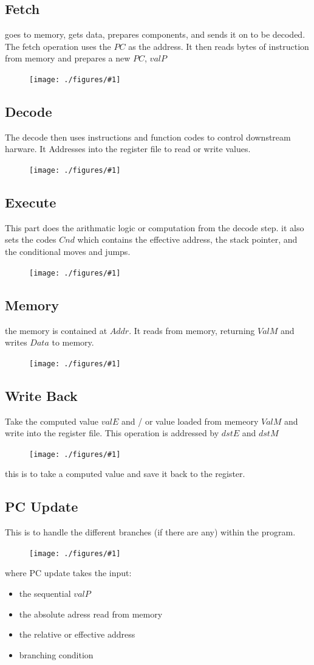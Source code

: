 \documentclass[12pt]{book}
\newcommand{\incimg}[2]{%
       \begin{figure}[h]
               \centering
               \texttt{[image: ./figures/\#1]}
       \end{figure}
}
\begin{document}
 \subsection*{Fetch}
goes to memory, gets data, prepares components, and sends it on to be decoded.
 The fetch operation uses the $PC$ as the address. It then reads bytes of instruction
 from memory and prepares a new $PC$, $valP$
 \incimg{fetch}{0.5}

 \subsection*{Decode}
 The decode then uses instructions and function codes to control downstream harware. It Addresses
 into the register file to read or write values.
 \incimg{decode}{0.5}

 \subsection*{Execute}
 This part does the arithmatic logic or computation from the decode step. it also sets the 
 codes $Cnd$ which contains the effective address, the stack pointer, and the conditional moves
 and jumps.
\incimg{execute}{0.5}

\subsection*{Memory}
the memory is contained at $Addr$. It reads from memory, returning $ValM$ and writes $Data$
to memory.
\incimg{memory}{0.5}

\subsection*{Write Back}
 Take the computed value $valE$ and / or value loaded from memeory $ValM$ and write into the 
 register file. This operation is addressed by $dstE$ and $dstM$
 \incimg{writeback}{0.5}

 this is to take a computed value and save it back to the register.
 \pagebreak

 \subsection*{PC Update}
 This is to handle the different branches (if there are any) within the program.
 \incimg{PCupdate}{0.5}

 where PC update takes the input:
 \begin{itemize}
         \item the sequential $valP$
         \item the absolute adress read from memory
         \item the relative or effective address
         \item branching condition
 \end{itemize}
\end{document}
